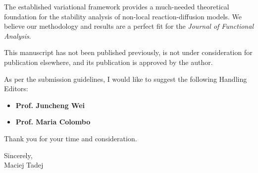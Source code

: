 \documentclass[11pt, a4paper]{article}
\begin{document}
The established variational framework provides a much-needed theoretical foundation for the stability analysis of non-local reaction-diffusion models. We believe our methodology and results are a perfect fit for the \textit{Journal of Functional Analysis}.

This manuscript has not been published previously, is not under consideration for publication elsewhere, and its publication is approved by the author.

As per the submission guidelines, I would like to suggest the following Handling Editors:
\begin{itemize}
    \item \textbf{Prof. Juncheng Wei}
    \item \textbf{Prof. Maria Colombo}
\end{itemize}

Thank you for your time and consideration.

\vspace{1em}

\begin{flushright}
Sincerely, \\
\vspace{1em}
Maciej Tadej
\end{flushright}
\end{document}
